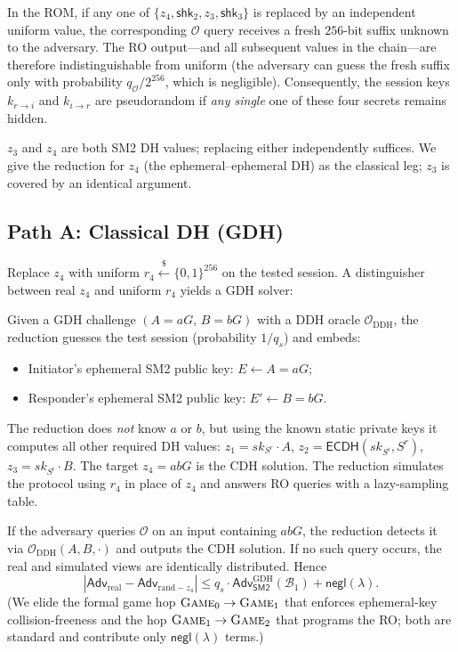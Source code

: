 \documentclass{SCIS2026}
\newcommand{\negl}{\mathsf{negl}}
\newcommand{\Adv}{\mathsf{Adv}}
\newcommand{\ECDH}{\mathsf{ECDH}}
\begin{document}
\begin{appendix}
In the ROM, if any one of $\{z_4, \textsf{shk}_2, z_3, \textsf{shk}_3\}$
is replaced by an independent uniform value, the corresponding
$\mathcal{O}$ query receives a fresh $256$-bit suffix unknown to the
adversary.  The RO output---and all subsequent values in the
chain---are therefore indistinguishable from uniform (the adversary
can guess the fresh suffix only with probability
$q_{\mathcal{O}}/2^{256}$, which is negligible).  Consequently, the
session keys $k_{r\to i}$ and $k_{i\to r}$ are pseudorandom if
\emph{any single} one of these four secrets remains hidden.

$z_3$ and $z_4$ are both SM2 DH values; replacing either independently
suffices.  We give the reduction for $z_4$ (the ephemeral--ephemeral
DH) as the classical leg; $z_3$ is covered by an identical argument.

\subsection{Path A: Classical DH (GDH)}

Replace $z_4$ with uniform $r_4 \xleftarrow{\$} \{0,1\}^{256}$ on the
tested session.  A distinguisher between real $z_4$ and uniform $r_4$
yields a GDH solver:

Given a GDH challenge $(A=aG,\, B=bG)$ with a DDH oracle
$\mathcal{O}_{\text{DDH}}$, the reduction guesses the test session
(probability $1/q_s$) and embeds:
\begin{itemize}
\item Initiator's ephemeral SM2 public key: $E \gets A = aG$;
\item Responder's ephemeral SM2 public key: $E' \gets B = bG$.
\end{itemize}
The reduction does \emph{not} know $a$ or $b$, but using the known
static private keys it computes all other required DH values:
$z_1 = \mathit{sk}_{S^r} \!\cdot\! A$,
$z_2 = \ECDH(\mathit{sk}_{S^i}, S^r)$,
$z_3 = \mathit{sk}_{S^i} \!\cdot\! B$.
The target $z_4 = abG$ is the CDH solution.  The reduction simulates
the protocol using $r_4$ in place of $z_4$ and answers RO queries
with a lazy-sampling table.

If the adversary queries $\mathcal{O}$ on an input containing $abG$,
the reduction detects it via $\mathcal{O}_{\text{DDH}}(A,B,\cdot)$ and
outputs the CDH solution.  If no such query occurs, the real and
simulated views are identically distributed.  Hence
\[
|\Adv_{\text{real}} - \Adv_{\text{rand}-z_4}| \le
q_s \!\cdot\! \Adv^{\mathrm{GDH}}_{\textsf{SM2}}(\mathcal{B}_1)
+ \negl(\lambda).
\]
(We elide the formal game hop $\textsc{Game}_0 \to \textsc{Game}_1$
that enforces ephemeral-key collision-freeness and the hop
$\textsc{Game}_1 \to \textsc{Game}_2$ that programs the RO; both are
standard and contribute only $\negl(\lambda)$ terms.)


\end{appendix}
\end{document}
